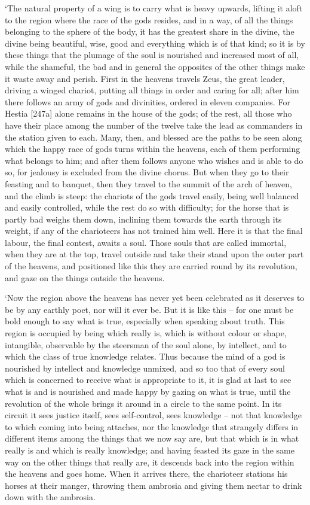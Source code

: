 ‘The natural property of a wing is to carry what is heavy upwards,
lifting it aloft to the region where the race of the gods resides, and
in a way, of all the
things belonging to the sphere of the body, it has the greatest share in
the divine, the divine  being beautiful, wise, good and
everything which is of that
kind; so it is by these
things that the plumage of the soul is nourished and increased most of
all, while the shameful, the bad and in general the opposites of the
other things make it waste away and perish. First in the heavens travels
Zeus, the  great leader, driving a winged chariot, putting all
things in order and caring for all; after him there follows an army of
gods and divinities, ordered in eleven companies. For Hestia {[}247a{]}
alone remains in the
house of the gods; of the rest, all those who have their place among the
number of the twelve take the lead as commanders in the station given to
each. Many, then, and blessed are the paths to be seen along which the
happy race  of gods turns within the heavens, each of them
performing what belongs to him; and after them follows anyone who wishes
and is able to do so, for jealousy is excluded from the divine chorus.
But when they go to their feasting and to banquet, then they travel to
the summit of the arch of heaven, and the climb is  steep: the
chariots of the gods travel easily, being well balanced and easily
controlled, while the rest do so with difficulty; for the horse that is
partly bad weighs them down, inclining them towards the earth through
its weight, if any of the charioteers has not trained him well. Here it
is that the final labour,
 the final contest, awaits a soul. Those souls that are called
immortal, when they are
at the top, travel outside and take their stand upon the outer part of
the heavens, and positioned  like this they are carried round by
its revolution, and gaze on the things outside the heavens.

‘Now the region above the heavens has never yet been celebrated as it
deserves to be by any earthly poet, nor will it ever be. But it is like
this -- for one must be bold enough to say what  is true,
especially when speaking about truth. This region is occupied by being
which really is, which is without colour or shape, intangible,
observable by the steersman of the soul alone, by intellect, and to
which the class of true knowledge
relates.  Thus
because the mind of a god is nourished by intellect and knowledge
unmixed, and so too that of every soul which is concerned to receive
what is appropriate to it, it is glad at last to see what is and is
nourished and made happy by gazing on  what is true, until the
revolution of the whole brings it around in a circle to the same point.
In its circuit it sees justice itself, sees
self-control, sees
knowledge -- not that knowledge to which coming into being attaches, nor
the knowledge that  strangely differs in different items among
the things that we now say
are, but that which is
in what really is and which is really knowledge; and having feasted its
gaze in the same way on the other things that really are, it descends
back into the region within the heavens and goes home. When it arrives
there,  the charioteer stations his horses at their manger,
throwing them ambrosia and giving them nectar to drink down with the
ambrosia.

